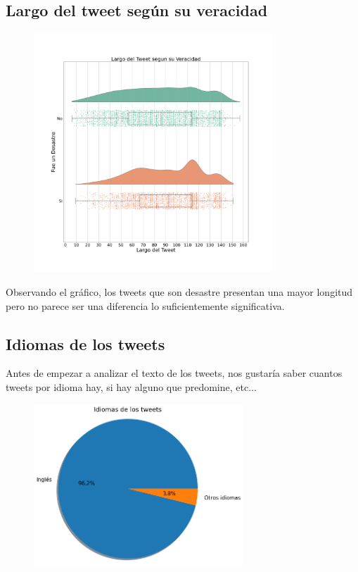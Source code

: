 \documentclass[titlepage,a4paper]{article}
\begin{document}
\subsection{\Large Largo del tweet según su veracidad}
{\Large
\begin{figure}[H]
 \centering
 \includegraphics[width=0.8\textwidth, height=0.8\textheight, keepaspectratio]{graficos/largo_tweet_veracidad_0.png}
\end{figure}
Observando el gráfico, los tweets que son desastre presentan una mayor longitud pero no parece ser una diferencia lo suficientemente significativa.
\par}
\subsection{\Large Idiomas de los tweets}
{\Large 
Antes de empezar a analizar el texto de los tweets, nos gustaría saber cuantos tweets por idioma hay, si hay alguno que predomine, etc...
\par}
{\Large
\begin{figure}[H]
 \centering
 \includegraphics[width=0.7\textwidth, height=0.7\textheight, keepaspectratio]{graficos/idiomasdelostweets.png}
\end{figure}
{\Large 
\par}
\par}
\end{document}
